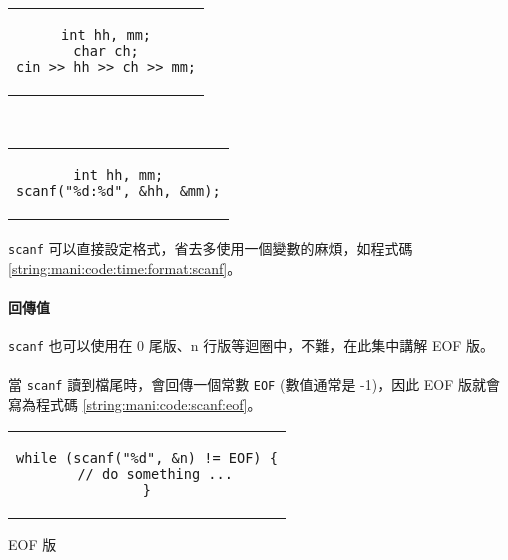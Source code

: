 \documentclass[12pt,a4paper,oneside]{article}
\begin{document}
\begin{CJK}{UTF8}{bkai}
\begin{code}[h!]
  \centering
  \begin{subcode}{.43\textwidth}
    \centering
    \begin{tabular}{c}
    \begin{lstlisting}
int hh, mm;
char ch;
cin >> hh >> ch >> mm;
    \end{lstlisting}
    \end{tabular}
    \caption{用 \lstinline!cin! 輸入}
    \label{string:mani:code:time:format:cin}
  \end{subcode}
  ~
  \begin{subcode}{.33\textwidth}
    \centering
    \begin{tabular}{c}
    \begin{lstlisting}
int hh, mm;
scanf("%d:%d", &hh, &mm);
    \end{lstlisting}
    \end{tabular}
    \caption{用 \lstinline!scanf! 輸入}
    \label{string:mani:code:time:format:scanf}
  \end{subcode}
  \caption{比較 \lstinline!cin! 與 \lstinline!scanf! 差異}
  \label{string:mani:code:time:format}
\end{code}

\paragraph{}\lstinline!scanf! 可以直接設定格式，省去多使用一個變數的麻煩，如程式碼 \ref{string:mani:code:time:format:scanf}。

\paragraph{回傳值}\lstinline!scanf! 也可以使用在 0 尾版、n 行版等迴圈中，不難，在此集中講解 EOF 版。
\paragraph{}當 \lstinline!scanf! 讀到檔尾時，會回傳一個常數 \lstinline!EOF! (數值通常是 -1)，因此 EOF 版就會寫為程式碼 \ref{string:mani:code:scanf:eof}。

\begin{code}[h!]
  \centering
  \begin{tabular}{c}
  \begin{lstlisting}
while (scanf("%d", &n) != EOF) {
  // do something ...
}
  \end{lstlisting}
  \end{tabular}
  \caption{EOF 版}
  \label{string:mani:code:scanf:eof}
\end{code}


\end{CJK}
\end{document}
